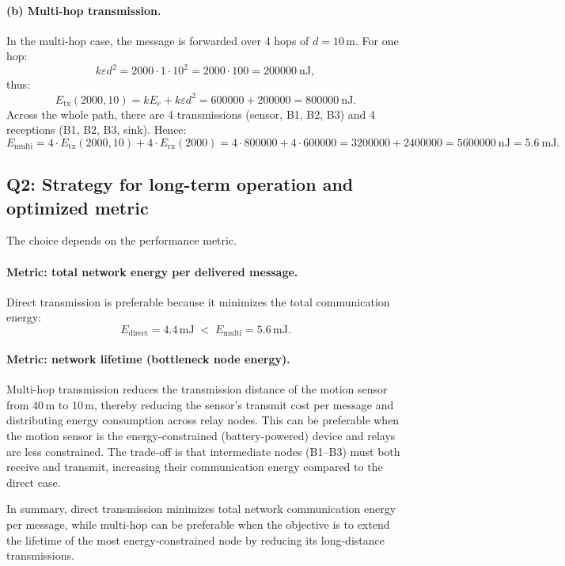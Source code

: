 \documentclass{article}
\begin{document}
\paragraph{(b) Multi-hop transmission.}
In the multi-hop case, the message is forwarded over 4 hops of \(d=10\,\mathrm{m}\).
For one hop:
\[
k\varepsilon d^2 = 2000 \cdot 1 \cdot 10^2
= 2000 \cdot 100
= 200000 \ \mathrm{nJ},
\]
thus:
\[
E_{\mathrm{tx}}(2000,10)=kE_c + k\varepsilon d^2
=600000+200000
=800000 \ \mathrm{nJ}.
\]
Across the whole path, there are 4 transmissions (sensor, B1, B2, B3) and 4 receptions (B1, B2, B3, sink). Hence:
\[
E_{\mathrm{multi}}=
4\cdot E_{\mathrm{tx}}(2000,10) + 4\cdot E_{\mathrm{rx}}(2000)
=4\cdot 800000 + 4\cdot 600000
=3200000+2400000
=5600000 \ \mathrm{nJ}
=5.6 \ \mathrm{mJ}.
\]

\subsection{Q2: Strategy for long-term operation and optimized metric}

The choice depends on the performance metric.

\paragraph{Metric: total network energy per delivered message.}
Direct transmission is preferable because it minimizes the total communication energy:
\[
E_{\mathrm{direct}}=4.4\,\mathrm{mJ} \;<\; E_{\mathrm{multi}}=5.6\,\mathrm{mJ}.
\]

\paragraph{Metric: network lifetime (bottleneck node energy).}
Multi-hop transmission reduces the transmission distance of the motion sensor from \(40\,\mathrm{m}\) to \(10\,\mathrm{m}\),
thereby reducing the sensor's transmit cost per message and distributing energy consumption across relay nodes.
This can be preferable when the motion sensor is the energy-constrained (battery-powered) device and relays are less constrained.
The trade-off is that intermediate nodes (B1--B3) must both receive and transmit, increasing their communication energy compared to the direct case.

In summary, direct transmission minimizes total network communication energy per message, while multi-hop can be preferable when the objective is to extend the lifetime of the most energy-constrained node by reducing its long-distance transmissions.
\end{document}
